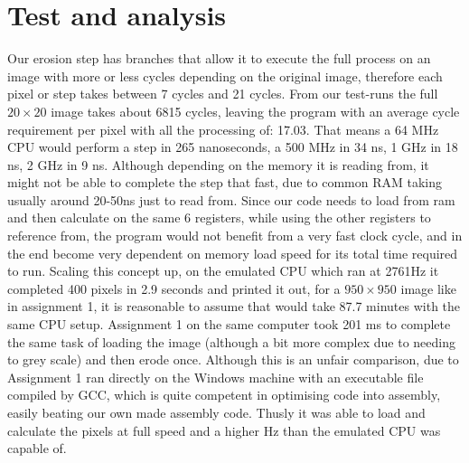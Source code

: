 \documentclass[a4paper, english]{article}
\numberwithin{equation}{section}
\begin{document}
\section{Test and analysis}\label{sec:test}
Our erosion step has branches that allow it to execute the full process on an image with more or less cycles depending on the original image, therefore each pixel or step takes between 7 cycles and 21 cycles. From our test-runs the full \(20 \times 20\) image takes about 6815 cycles, leaving the program with an average cycle requirement per pixel with all the processing of: 17.03. That means a 64 MHz CPU would perform a step in 265 nanoseconds, a 500 MHz in 34 ns, 1 GHz in 18 ns, 2 GHz in 9 ns. Although depending on the memory it is reading from, it might not be able to complete the step that fast, due to common RAM taking usually around 20-50ns just to read from. Since our code needs to load from ram and then calculate on the same 6 registers, while using the other registers to reference from, the program would not benefit from a very fast clock cycle, and in the end become very dependent on memory load speed for its total time required to run. Scaling this concept up, on the emulated CPU which ran at 2761Hz it completed 400 pixels in 2.9 seconds and printed it out, for a \(950 \times 950\) image like in assignment 1, it is reasonable to assume that would take 87.7 minutes with the same CPU setup. Assignment 1 on the same computer took 201 ms to complete the same task of loading the image (although a bit more complex due to needing to grey scale) and then erode once. Although this is an unfair comparison, due to Assignment 1 ran directly on the Windows machine with an executable file compiled by GCC, which is quite competent in optimising code into assembly, easily beating our own made assembly code. Thusly it was able to load and calculate the pixels at full speed and a higher Hz than the emulated CPU was capable of.

%
%




%
\end{document}
